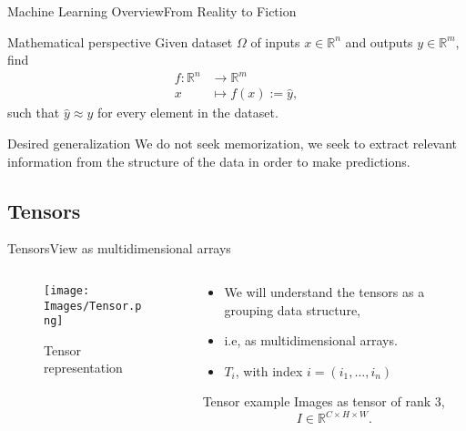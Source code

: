 \documentclass{beamer}
\newcommand{\R}{\mathbb{R}}
\begin{document}
\begin{frame}[t]{Machine Learning Overview}{From Reality to Fiction}
  \begin{block}{Mathematical perspective}
    Given dataset \(\Omega\) of inputs \(x \in \R^n\) and outputs
    \(y \in \R^m\), find
    \begin{equation}
      \begin{aligned}
        f \colon \R^n &\longrightarrow \R^m\\
        x &\longmapsto f(x) := \hat{y},
      \end{aligned}
    \end{equation}
    such that \(\hat{y} \approx y\) for every element in the dataset.
  \end{block}
  \pause
  \begin{alertblock}{Desired generalization}
    We do not seek memorization, we seek to extract relevant information from
    the structure of the data in order to make \alert{predictions}.
  \end{alertblock}
\end{frame}


\subsection{Tensors}

\begin{frame}{Tensors}{View as multidimensional arrays}
  \begin{columns}
    \begin{column}{.5\textwidth}
      \begin{figure}
        \texttt{[image: Images/Tensor.png]}
        \caption{Tensor representation}
      \end{figure}
    \end{column}
    \begin{column}{.5\textwidth}
      \begin{itemize}
        \item We will understand the tensors as a grouping data structure,
        \item i.e, as multidimensional arrays.
        \item \(T_i\), with index \(i = (i_1, \ldots, i_n)\)
      \end{itemize}
      \begin{exampleblock}{Tensor example}
        Images as tensor of rank 3,
        \begin{equation}
          I \in \R^{C \times H \times W}.
        \end{equation}
      \end{exampleblock}
    \end{column}
  \end{columns}
\end{frame}
\end{document}
